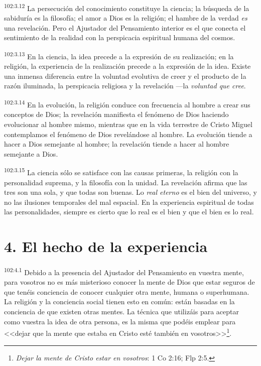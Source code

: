 \par
\textsuperscript{102:3.12} La persecución del conocimiento constituye la ciencia; la búsqueda de la sabiduría es la filosofía; el amor a Dios es la religión; el hambre de la verdad \textit{es} una revelación. Pero el Ajustador del Pensamiento interior es el que conecta el sentimiento de la realidad con la perspicacia espiritual humana del cosmos.

\par
\textsuperscript{102:3.13} En la ciencia, la idea precede a la expresión de su realización; en la religión, la experiencia de la realización precede a la expresión de la idea. Existe una inmensa diferencia entre la voluntad evolutiva de creer y el producto de la razón iluminada, la perspicacia religiosa y la revelación ---la \textit{voluntad que cree}.

\par
\textsuperscript{102:3.14} En la evolución, la religión conduce con frecuencia al hombre a crear sus conceptos de Dios; la revelación manifiesta el fenómeno de Dios haciendo evolucionar al hombre mismo, mientras que en la vida terrestre de Cristo Miguel contemplamos el fenómeno de Dios revelándose al hombre. La evolución tiende a hacer a Dios semejante al hombre; la revelación tiende a hacer al hombre semejante a Dios.

\par
\textsuperscript{102:3.15} La ciencia sólo se satisface con las causas primeras, la religión con la personalidad suprema, y la filosofía con la unidad. La revelación afirma que las tres son una sola, y que todas son buenas. Lo \textit{real eterno} es el bien del universo, y no las ilusiones temporales del mal espacial. En la experiencia espiritual de todas las personalidades, siempre es cierto que lo real es el bien y que el bien es lo real.

\section*{4. El hecho de la experiencia}
\par
\textsuperscript{102:4.1} Debido a la presencia del Ajustador del Pensamiento en vuestra mente, para vosotros no es más misterioso conocer la mente de Dios que estar seguros de que tenéis conciencia de conocer cualquier otra mente, humana o superhumana. La religión y la conciencia social tienen esto en común: están basadas en la conciencia de que existen otras mentes. La técnica que utilizáis para aceptar como vuestra la idea de otra persona, es la misma que podéis emplear para <<dejar que la mente que estaba en Cristo esté también en vosotros>>\footnote{\textit{Dejar la mente de Cristo estar en vosotros}: 1 Co 2:16; Flp 2:5.}.

